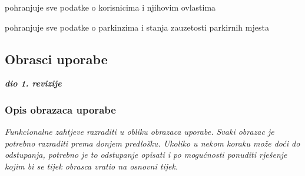                 \begin{packed_enum}
				\item  {}
				
				\begin{packed_enum}
					
					
					\item pohranjuje sve podatke o korisnicima i njihovim ovlastima
					\item pohranjuje sve podatke o parkinzima i stanja zauzetosti parkirnih mjesta
					
					
				\end{packed_enum}
                \end{packed_enum}
			
			\eject 
			
			
				
			\subsection{Obrasci uporabe}
				
				\textbf{\textit{dio 1. revizije}}
				
				\subsubsection{Opis obrazaca uporabe}
					\textit{Funkcionalne zahtjeve razraditi u obliku obrazaca uporabe. Svaki obrazac je potrebno razraditi prema donjem predlošku. Ukoliko u nekom koraku može doći do odstupanja, potrebno je to odstupanje opisati i po mogućnosti ponuditi rješenje kojim bi se tijek obrasca vratio na osnovni tijek.}\\
					

